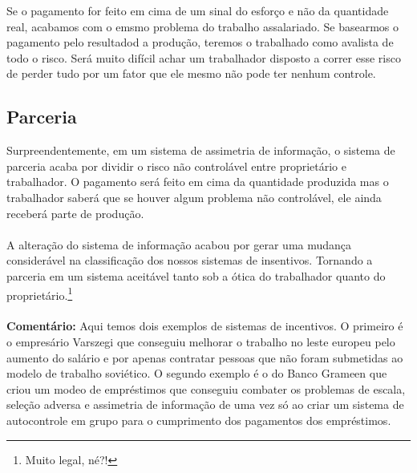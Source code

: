 \documentclass[a4paper,11pt,oneside]{book}
\theoremstyle{definition}
\theoremstyle{break}
\begin{document}
Se o pagamento for feito em cima de um sinal do esforço e não da quantidade real, acabamos com o emsmo problema do trabalho assalariado. Se basearmos o pagamento pelo resultadod a produção, teremos o trabalhado como avalista de todo o risco. Será muito difícil achar um trabalhador disposto a correr esse risco de perder tudo por um fator que ele mesmo não pode ter nenhum controle.

\subsection*{Parceria}

Surpreendentemente, em um sistema de assimetria de informação, o sistema de parceria acaba por dividir o risco não controlável entre proprietário e trabalhador. O pagamento será feito em cima da quantidade produzida mas o trabalhador saberá que se houver algum problema não controlável, ele ainda receberá parte de produção.
\\~\\
A alteração do sistema de informação acabou por gerar uma mudança considerável na classificação dos nossos sistemas de insentivos. Tornando a parceria em um sistema aceitável tanto sob a ótica do trabalhador quanto do proprietário.\footnote{Muito legal, né?!}
\\~\\
\textbf{Comentário:} Aqui temos dois exemplos de sistemas de incentivos. O primeiro é o empresário Varszegi que conseguiu melhorar o trabalho no leste europeu pelo aumento do salário e por apenas contratar pessoas que não foram submetidas ao modelo de trabalho soviético. O segundo exemplo é o do Banco Grameen que criou um modeo de empréstimos que conseguiu combater os problemas de escala, seleção adversa e assimetria de informação de uma vez só ao criar um sistema de autocontrole em grupo para o cumprimento dos pagamentos dos empréstimos.
\end{document}
